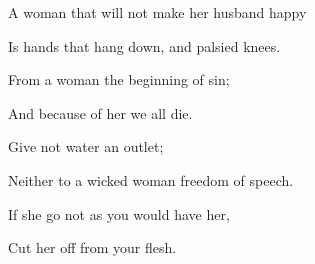 {\par }{\Q A woman that will not make her husband happy
\par }{\Q Is
{} hands that hang down, and palsied knees.
\par }{\Q {}From a woman
{} the beginning of sin;
\par }{\Q And because of her we all die.
\par }{\Q {}Give not water an outlet;
\par }{\Q Neither to a wicked woman freedom of speech.
\par }{\Q {}If she go not
 as you would have her,
\par }{\Q Cut her off from your flesh.
\par }{\BB \par }

